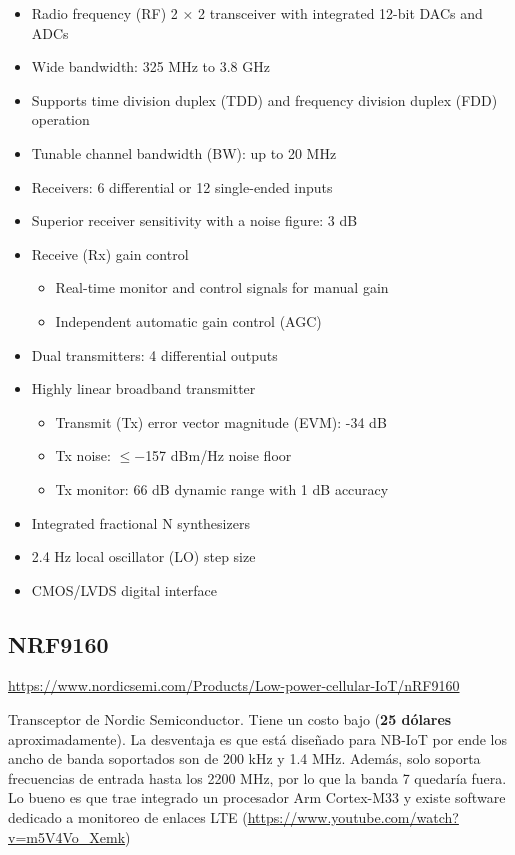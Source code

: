 \documentclass[a4paper,12pt]{report} %
\begin{document}
\begin{itemize}
	\item Radio frequency (RF) 2 × 2 transceiver with integrated 12-bit DACs and ADCs
	\item Wide bandwidth: 325 MHz to 3.8 GHz
	\item Supports time division duplex (TDD) and frequency division duplex (FDD) operation
	\item Tunable channel bandwidth (BW): up to 20 MHz
	\item Receivers: 6 differential or 12 single-ended inputs
	\item Superior receiver sensitivity with a noise figure: 3 dB
	\item Receive (Rx) gain control
	\begin{itemize}
		\item Real-time monitor and control signals for manual gain
		\item Independent automatic gain control (AGC)
	\end{itemize}
	\item Dual transmitters: 4 differential outputs
	\item Highly linear broadband transmitter
	\begin{itemize}
		\item Transmit (Tx) error vector magnitude (EVM): -34 dB
		\item Tx noise: $\leqslant-$157 dBm/Hz noise floor
		\item Tx monitor: 66 dB dynamic range with 1 dB accuracy
	\end{itemize}
	\item Integrated fractional N synthesizers
	\item 2.4 Hz local oscillator (LO) step size
	\item CMOS/LVDS digital interface
\end{itemize}

\subsection{NRF9160}

\url{https://www.nordicsemi.com/Products/Low-power-cellular-IoT/nRF9160}

Transceptor de Nordic Semiconductor. Tiene un costo bajo (\textbf{25 dólares} aproximadamente). La desventaja es que está diseñado para NB-IoT por ende los ancho de banda soportados son de 200 kHz y 1.4 MHz. Además, solo soporta frecuencias de entrada hasta los 2200 MHz, por lo que la banda 7 quedaría fuera. Lo bueno es que trae integrado un procesador Arm Cortex-M33 y existe software dedicado a monitoreo de enlaces LTE (\url{https://www.youtube.com/watch?v=m5V4Vo_Xemk})
\end{document}
